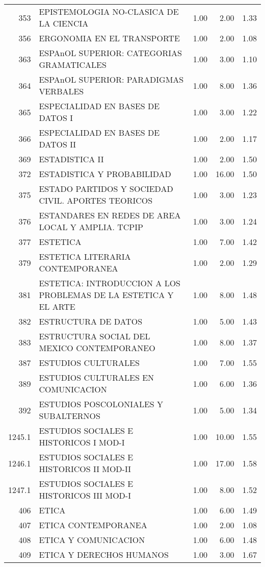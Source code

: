 \documentclass[12pt]{article}
\begin{document}
\begin{table}[ht]
\begin{tabular}{rlrrr}
  353 & EPISTEMOLOGIA NO-CLASICA DE LA CIENCIA & 1.00 & 2.00 & 1.33 \\ 
  356 & ERGONOMIA EN EL TRANSPORTE & 1.00 & 2.00 & 1.08 \\ 
  363 & ESPAnOL SUPERIOR: CATEGORIAS GRAMATICALES & 1.00 & 3.00 & 1.10 \\ 
  364 & ESPAnOL SUPERIOR: PARADIGMAS VERBALES & 1.00 & 8.00 & 1.36 \\ 
  365 & ESPECIALIDAD EN BASES DE DATOS I & 1.00 & 3.00 & 1.22 \\ 
  366 & ESPECIALIDAD EN BASES DE DATOS II & 1.00 & 2.00 & 1.17 \\ 
  369 & ESTADISTICA II & 1.00 & 2.00 & 1.50 \\ 
  372 & ESTADISTICA Y PROBABILIDAD & 1.00 & 16.00 & 1.50 \\ 
  375 & ESTADO PARTIDOS Y SOCIEDAD CIVIL. APORTES TEORICOS & 1.00 & 3.00 & 1.23 \\ 
  376 & ESTANDARES EN REDES DE AREA LOCAL Y AMPLIA. TCPIP & 1.00 & 3.00 & 1.24 \\ 
  377 & ESTETICA & 1.00 & 7.00 & 1.42 \\ 
  379 & ESTETICA LITERARIA CONTEMPORANEA & 1.00 & 2.00 & 1.29 \\ 
  381 & ESTETICA: INTRODUCCION A LOS PROBLEMAS DE LA ESTETICA Y EL ARTE & 1.00 & 8.00 & 1.48 \\ 
  382 & ESTRUCTURA DE DATOS & 1.00 & 5.00 & 1.43 \\ 
  383 & ESTRUCTURA SOCIAL DEL MEXICO CONTEMPORANEO & 1.00 & 8.00 & 1.37 \\ 
  387 & ESTUDIOS CULTURALES & 1.00 & 7.00 & 1.55 \\ 
  389 & ESTUDIOS CULTURALES EN COMUNICACION & 1.00 & 6.00 & 1.36 \\ 
  392 & ESTUDIOS POSCOLONIALES Y SUBALTERNOS & 1.00 & 5.00 & 1.34 \\ 
  1245.1 & ESTUDIOS SOCIALES E HISTORICOS I MOD-I & 1.00 & 10.00 & 1.55 \\ 
  1246.1 & ESTUDIOS SOCIALES E HISTORICOS II MOD-II & 1.00 & 17.00 & 1.58 \\ 
  1247.1 & ESTUDIOS SOCIALES E HISTORICOS III MOD-I & 1.00 & 8.00 & 1.52 \\ 
  406 & ETICA & 1.00 & 6.00 & 1.49 \\ 
  407 & ETICA CONTEMPORANEA & 1.00 & 2.00 & 1.08 \\ 
  408 & ETICA Y COMUNICACION & 1.00 & 6.00 & 1.48 \\ 
  409 & ETICA Y DERECHOS HUMANOS & 1.00 & 3.00 & 1.67 \\ 

\end{tabular}
\end{table}
\end{document}
